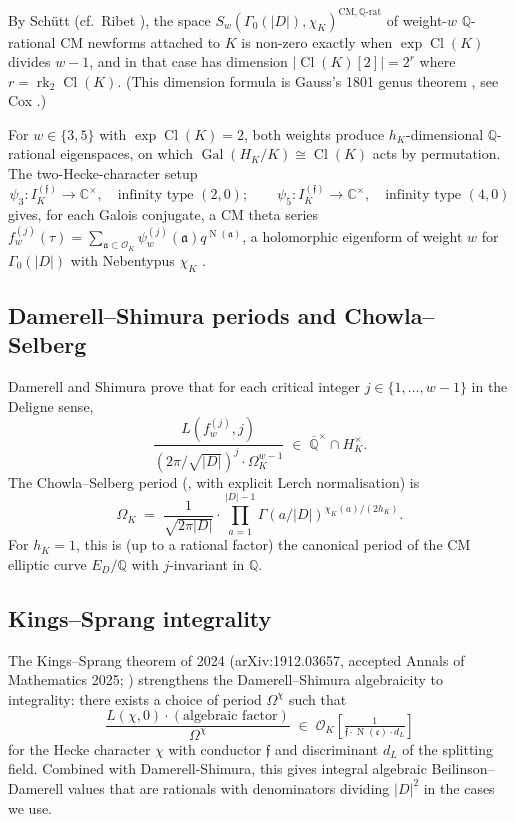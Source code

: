 \documentclass[11pt]{amsart}
\theoremstyle{definition}
\theoremstyle{remark}
\DeclareMathOperator{\Cl}{Cl}
\DeclareMathOperator{\rk}{rk}
\DeclareMathOperator{\Gal}{Gal}
\DeclareMathOperator{\Nm}{N}
\newcommand{\Q}{\mathbb{Q}}
\newcommand{\C}{\mathbb{C}}
\newcommand{\OK}{\mathcal{O}_K}
\newcommand{\HK}{H_K}
\newcommand{\chiK}{\chi_K}
\newcommand{\fr}[1]{\mathfrak{#1}}
\begin{document}
By Sch\"utt \cite{Schutt2008} (cf.\ Ribet \cite{Ribet1977}), the space
$S_w(\Gamma_0(|D|), \chiK)^{\mathrm{CM}, \Q\text{-rat}}$ of weight-$w$
$\Q$-rational CM newforms attached to $K$ is non-zero exactly when
$\exp\Cl(K)$ divides $w-1$, and in that case has dimension
$|\Cl(K)[2]| = 2^{r}$ where $r = \rk_2 \Cl(K)$. (This dimension formula
is Gauss's 1801 genus theorem \cite{Gauss1801}, see Cox
\cite[Thm.~3.15]{Cox1989}.)

For $w \in \{3, 5\}$ with $\exp\Cl(K) = 2$, both weights produce $h_K$-dimensional
$\Q$-rational eigenspaces, on which $\Gal(\HK/K) \cong \Cl(K)$ acts by
permutation. The two-Hecke-character setup
\[
\psi_3 \colon I_K^{(\fr f)} \to \C^\times, \quad \text{infinity type } (2, 0);
\qquad \psi_5 \colon I_K^{(\fr f)} \to \C^\times, \quad \text{infinity type } (4, 0)
\]
gives, for each Galois conjugate, a CM theta series
$f_w^{(j)}(\tau) = \sum_{\fr a \subset \OK} \psi_w^{(j)}(\fr a) q^{\Nm(\fr a)}$,
a holomorphic eigenform of weight $w$ for $\Gamma_0(|D|)$ with Nebentypus $\chiK$
\cite{Hecke1937, Shimura1971}.

\subsection{Damerell--Shimura periods and Chowla--Selberg}\label{ss:damerell}

Damerell \cite{Damerell1971} and Shimura \cite{Shimura1976} prove that
for each critical integer $j \in \{1, \dots, w-1\}$ in the Deligne sense,
\[
\frac{L(f_w^{(j)}, j)}{(2\pi/\sqrt{|D|})^{j} \cdot \Omega_K^{w-1}} \;\in\;
\overline{\Q}^\times \cap \HK^\times.
\]
The Chowla--Selberg period (\cite{ChowlaSelberg1949}, with explicit
Lerch normalisation) is
\[
\Omega_K \;=\; \frac{1}{\sqrt{2\pi |D|}} \cdot \prod_{a=1}^{|D|-1}
\Gamma(a/|D|)^{\chiK(a) / (2 h_K)}.
\]
For $h_K = 1$, this is (up to a rational factor) the canonical period
of the CM elliptic curve $E_D / \Q$ with $j$-invariant in $\Q$.

\subsection{Kings--Sprang integrality}\label{ss:kings-sprang}

The Kings--Sprang theorem of 2024 (arXiv:1912.03657, accepted Annals
of Mathematics 2025; \cite{KingsSprang2025}) strengthens the Damerell--Shimura
algebraicity to integrality: there exists a choice of period
$\Omega^\chi$ such that
\[
\frac{L(\chi, 0) \cdot (\text{algebraic factor})}{\Omega^\chi}
\;\in\; \OK\!\left[\tfrac{1}{\fr f \cdot \Nm(\fr c) \cdot d_L}\right]
\]
for the Hecke character $\chi$ with conductor $\fr f$ and discriminant
$d_L$ of the splitting field. Combined with Damerell-Shimura, this
gives integral algebraic Beilinson--Damerell values that are
rationals with denominators dividing $|D|^2$ in the cases we use.
\end{document}
